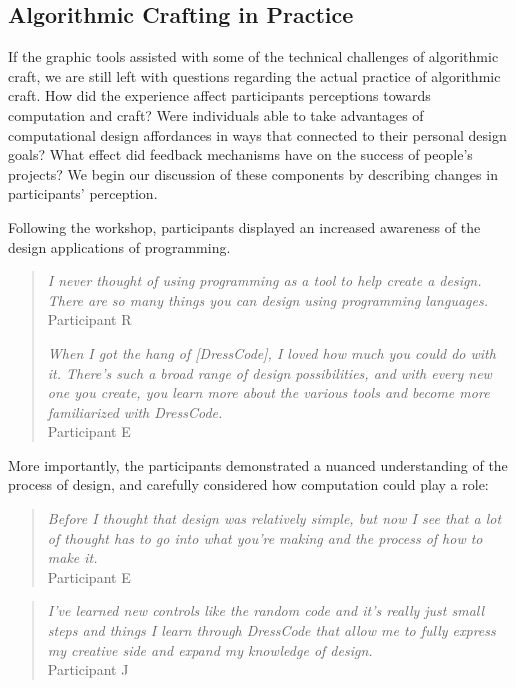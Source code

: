 \documentclass{sigchi}
\begin{document}
\subsection{Algorithmic Crafting in Practice}
If the graphic tools assisted with some of the technical challenges of algorithmic craft, we are still left with questions regarding the actual practice of algorithmic craft. How did the experience affect participants perceptions towards computation and craft? Were individuals able to take advantages of computational design affordances in ways that connected to their personal design goals? What effect did feedback mechanisms have on the success of people's projects? We begin our discussion of these components by describing changes in participants' perception. 

Following the workshop, participants displayed an increased awareness of the design applications of programming. 
\begin{quotation}
		\textit{I never thought of using programming as a tool to help create a design. There are so many things you can design using programming languages.}
		\\Participant R
		
		\textit{When I got the hang of [DressCode], I loved how much you could do with it. There's such a broad range of design possibilities, and with every new one you create, you learn more about the various tools and become more familiarized with DressCode.}
		\\Participant E
\end{quotation}

More importantly, the participants demonstrated a nuanced understanding of the process of design, and carefully considered how computation could play a role: 
\begin{quotation}
	\textit{Before I thought that design was relatively simple, but now I see that a lot of thought has to go into what you're making and the process of how to make it.}
		\\Participant E
	\end{quotation}
	
\begin{quotation}
	\textit{I've learned new controls like the random code and it's really just small steps and things I learn through DressCode that allow me to fully express my creative side and expand my knowledge of design.}
	\\Participant J
\end{quotation}
\end{document}
